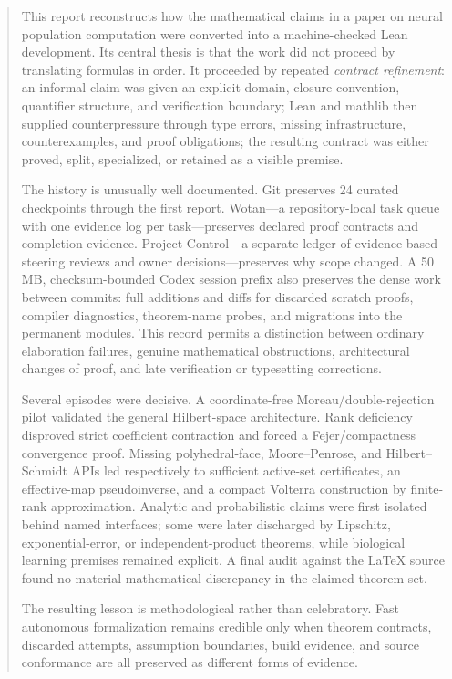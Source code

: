 \documentclass[11pt,a4paper]{article}
\begin{document}
\hypersetup{pageanchor=true}

\begin{abstract}
This report reconstructs how the mathematical claims in a paper on neural
population computation were converted into a machine-checked Lean development.
Its central thesis is that the work did not proceed by translating formulas in
order. It proceeded by repeated \emph{contract refinement}: an informal claim was
given an explicit domain, closure convention, quantifier structure, and verification
boundary; Lean and mathlib then supplied counterpressure through type errors,
missing infrastructure, counterexamples, and proof obligations; the resulting
contract was either proved, split, specialized, or retained as a visible premise.

The history is unusually well documented. Git preserves 24 curated checkpoints
through the first report. Wotan---a repository-local task queue with one evidence
log per task---preserves declared proof contracts and completion evidence. Project
Control---a separate ledger of evidence-based steering reviews and owner
decisions---preserves why scope changed. A 50 MB, checksum-bounded Codex session
prefix also preserves the dense work between commits: full additions and diffs for
discarded scratch proofs, compiler diagnostics, theorem-name probes, and migrations
into the permanent modules. This record permits a distinction between ordinary
elaboration failures, genuine mathematical obstructions, architectural changes of
proof, and late verification or typesetting corrections.

Several episodes were decisive. A coordinate-free Moreau/double-rejection pilot
validated the general Hilbert-space architecture. Rank deficiency disproved strict
coefficient contraction and forced a Fejer/compactness convergence proof. Missing
polyhedral-face, Moore--Penrose, and Hilbert--Schmidt APIs led respectively to
sufficient active-set certificates, an effective-map pseudoinverse, and a compact
Volterra construction by finite-rank approximation. Analytic and probabilistic
claims were first isolated behind named interfaces; some were later discharged by
Lipschitz, exponential-error, or independent-product theorems, while biological
learning premises remained explicit. A final audit against the LaTeX source found no
material mathematical discrepancy in the claimed theorem set.

The resulting lesson is methodological rather than celebratory. Fast autonomous
formalization remains credible only when theorem contracts, discarded attempts,
assumption boundaries, build evidence, and source conformance are all preserved as
different forms of evidence.
\end{abstract}
\end{document}
